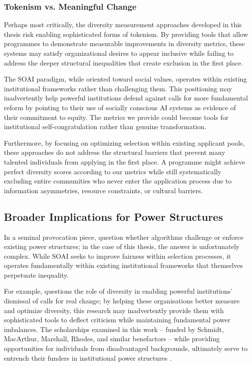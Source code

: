 \subsubsection{Tokenism vs. Meaningful Change}
Perhaps most critically, the diversity measurement approaches developed in this thesis risk enabling sophisticated forms of tokenism. By providing tools that allow programmes to demonstrate measurable improvements in diversity metrics, these systems may satisfy organizational desires to appear inclusive while failing to address the deeper structural inequalities that create exclusion in the first place.

The SOAI paradigm, while oriented toward social values, operates within existing institutional frameworks rather than challenging them. This positioning may inadvertently help powerful institutions defend against calls for more fundamental reform by pointing to their use of socially conscious AI systems as evidence of their commitment to equity. The metrics we provide could become tools for institutional self-congratulation rather than genuine transformation.

Furthermore, by focusing on optimizing selection within existing applicant pools, these approaches do not address the structural barriers that prevent many talented individuals from applying in the first place. A programme might achieve perfect diversity scores according to our metrics while still systematically excluding entire communities who never enter the application process due to information asymmetries, resource constraints, or cultural barriers.

\subsection{Broader Implications for Power Structures}
In a seminal provocation piece, \textcite{Barocas_Hood_Ziewitz_2013} question whether algorithms challenge or enforce existing power structures; in the case of this thesis, the answer is unfortunately complex. While SOAI seeks to improve fairness within selection processes, it operates fundamentally within existing institutional frameworks that themselves perpetuate inequality.

For example, \textcite{Ahmed_2012} questions the role of diversity in enabling powerful institutions' dismissal of calls for real change; by helping these organisations better measure and optimize diversity, this research may inadvertently provide them with sophisticated tools to deflect criticism while maintaining fundamental power imbalances. The scholarships examined in this work – funded by Schmidt, MacArthur, Marshall, Rhodes, and similar benefactors – while providing opportunities for individuals from disadvantaged backgrounds, ultimately serve to entrench their funders in institutional power structures \cite{Ziegler_2008}.


